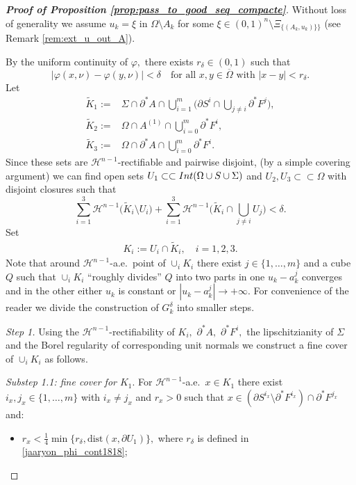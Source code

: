 \documentclass[reqno]{amsart}
\numberwithin{equation}{section}
\theoremstyle{plain}
\theoremstyle{definition}
\newcommand{\cH}{\mathcal{H}}
\newcommand{\p}{\partial}
\newcommand{\cl}[1]{\overline{#1}}
\newcommand{\strictlyincluded}{\subset\subset}
\renewcommand{\tilde}{\widetilde}
\newcommand{\dist}{\mathrm{dist}}
\newcommand{\substrate}{S}
\newcommand{\Ins}[1]{{\rm Int}{(#1\cup \substrate\cup \Sigma)}}
\begin{document}
\begin{proof}[\textbf{Proof of Proposition \ref{prop:pass_to_good_seq_compacte}}] 
Without loss of generality we assume $u_k=\xi$ in $\Omega\setminus A_k$ for some $\xi\in (0,1)^n\setminus \Xi_{\{(A_k,u_k)\}\}}$ (see Remark \ref{rem:ext_u_out_A}). 


By the uniform continuity of $\varphi,$ there exists  $r_\delta\in(0,1)$ such that 
\begin{equation}\label{jaaryon_phi_cont1818}
|\varphi(x,\nu) - \varphi(y,\nu)|<\delta\quad\text{for all $x,y\in\cl{\Omega}$ with $|x-y|<r_\delta.$} 
\end{equation}
%
Let
\begin{align*}
\tilde K_1:= & \Sigma \cap \p^*A \cap \bigcup_{i=1}^m \Big( \p S^i \cap \bigcup_{j\ne i}\p^*F^j\Big),\\
\tilde K_2:= & \Omega\cap A^{(1)}\cap \bigcup_{i=0}^m \p^*F^i,\\ 
\tilde K_3:= & \Omega\cap \p^*A \cap \bigcup_{i=0}^m \p^*F^i. 
\end{align*}
%
Since these sets are $\cH^{n-1}$-rectifiable and pairwise disjoint, (by a simple covering argument) we can find open sets $U_1\strictlyincluded\Ins{\Omega}$ and $U_2,U_3\strictlyincluded \Omega$ with disjoint closures such that
\begin{equation}\label{four_disjoint_sets}
\sum\limits_{i=1}^3 \cH^{n-1}\big(\tilde K_i \setminus U_i\big)
+
\sum\limits_{i=1}^3 \cH^{n-1}\Big(\tilde K_i \cap \bigcup_{j\ne i} U_j\Big) 
< \delta.
\end{equation}
Set 
\begin{align*}
K_i:= U_i\cap \tilde K_i,\quad i=1,2,3. 
\end{align*}
%
Note that around $\cH^{n-1}$-a.e.\  point of $\cup_i K_i$ there exist $j\in\{1,\ldots,m\}$ and a cube $Q$ such that $\cup_i K_i$ ``roughly divides'' $Q$ into two parts in one $u_k-a_k^j$ converges and in the other either $u_k$ is constant or $|u_k-a_k^j| \to+\infty.$
For convenience of the reader we divide the construction of $G_k^\delta$ into smaller steps.


{\it Step 1.} Using the $\cH^{n-1}$-rectifiability of $K_i,$ $\p^*A,$ $\p^*F^i,$ the lipschitzianity of $\Sigma$ and the Borel regularity of corresponding unit normals we construct a fine cover of $\cup_iK_i$ as follows.
\smallskip

{\it Substep 1.1: fine cover for $K_1.$}  For $\cH^{n-1}$-a.e.\  $x\in K_1$ there exist $i_x,j_x\in\{1,\ldots,m\}$ with $i_x\ne j_x$ and $r_x>0$ such that $x\in (\p S^{i_x}\setminus \p^*F^{i_x})\cap \p^*F^{j_x}$ and:
%
\begin{itemize}
%
\item[($\rm a_{1.1}$)] $r_x<\frac14\min\{r_\delta,\dist(x,\p U_1)\},$ where $r_\delta$ is defined in \eqref{jaaryon_phi_cont1818};



\end{itemize}
\end{proof}
\end{document}
